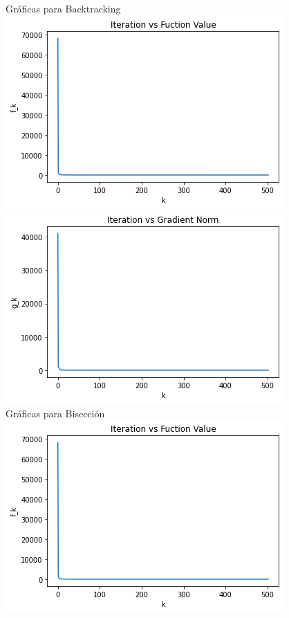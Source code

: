 \documentclass[11pt,letterpaper]{article}
\theoremstyle{definition}
\theoremstyle{definition}
\theoremstyle{definition}
\begin{document}
\begin{center}
Gráficas para Backtracking
\\
\includegraphics[width=0.8\linewidth]{graficas/bt_f}
\\
\includegraphics[width=0.8\linewidth]{graficas/bt_g}
\\
Gráficas para Bisección
\\
\includegraphics[width=0.8\linewidth]{graficas/bic_f}
\\

\end{center}
\end{document}
